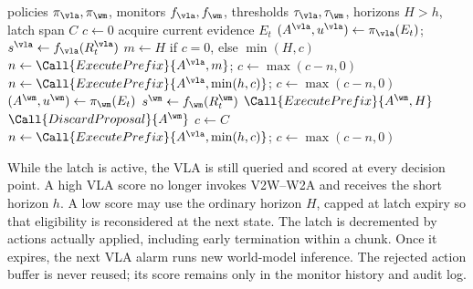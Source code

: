 \begin{algorithm}[t]
  \caption{\method{} selective execution for one episode}
  \label{alg:uvowel}
  \footnotesize
  \begin{algorithmic}[1]
    \Require policies \(\pi_\vla,\pi_\wm\), monitors \(f_\vla,f_\wm\),
      thresholds \(\tau_\vla,\tau_\wm\), horizons \(H>h\), latch span \(C\)
    \State \(c\gets0\) 
      \State acquire current evidence \(E_t\)
      \State \((A^\vla,u^\vla)\gets\pi_\vla(E_t)\);
        \(s^\vla\gets f_\vla(R_t^\vla)\)
        \State \(m\gets H\) if \(c=0\), else \(\min(H,c)\)
        \State \(n\gets\Call{ExecutePrefix}{A^\vla,m}\);
          \(c\gets\max(c-n,0)\)
        \State \(n\gets\Call{ExecutePrefix}{A^\vla,\min(h,c)}\);
          \(c\gets\max(c-n,0)\)
      \Else
        \State \((A^\wm,u^\wm)\gets\pi_\wm(E_t)\)
        \State \(s^\wm\gets f_\wm(R_t^\wm)\)
          \State \(\Call{ExecutePrefix}{A^\wm,H}\)
        \Else
          \State \(\Call{DiscardProposal}{A^\wm}\)
          \State \(c\gets C\)
          \State \(n\gets\Call{ExecutePrefix}{A^\vla,\min(h,c)}\);
            \(c\gets\max(c-n,0)\)
        \EndIf
      \EndIf
    \EndWhile
  \end{algorithmic}
\end{algorithm}

While the latch is active, the VLA is still queried and scored at every
decision point. A high VLA score no longer invokes V2W--W2A and receives the
short horizon \(h\). A low score may use the ordinary horizon \(H\), capped at
latch expiry so that eligibility is reconsidered at the next state. The latch
is decremented by actions actually applied, including early termination within
a chunk. Once it expires, the next VLA alarm runs new world-model inference.
The rejected action buffer is never reused; its score remains only in the
monitor history and audit log.

\FloatBarrier
